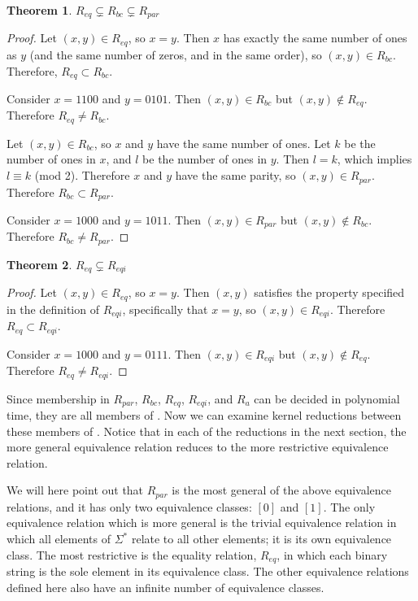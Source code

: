 \documentclass{amsart}
\newtheorem{theorem}{Theorem}[section]
\theoremstyle{definition} \newtheorem{definition}[definition]{Definition}
\newcommand{\sigmastar}{\Sigma^{*}} %
\begin{document}
\begin{theorem}$R_{eq} \subsetneq R_{bc} \subsetneq R_{par}$\end{theorem}
\begin{proof}
  Let $(x, y)\in R_{eq}$, so $x=y$. Then $x$ has exactly the same number of
  ones as $y$ (and the same number of zeros, and in the same order), so $(x, y)
  \in R_{bc}$. Therefore, $R_{eq} \subset R_{bc}$.
 
  Consider $x=1100$ and $y=0101$. Then $(x, y)\in R_{bc}$ but $(x, y) \notin
  R_{eq}$. Therefore $R_{eq} \neq R_{bc}$.

  Let $(x, y)\in R_{bc}$, so $x$ and $y$ have the same number of ones. Let $k$
  be the number of ones in $x$, and $l$ be the number of ones in $y$. Then
  $l=k$, which implies $l \equiv k$ (mod 2). Therefore $x$ and $y$ have
  the same parity, so $(x, y)\in R_{par}$. Therefore $R_{bc} \subset R_{par}$.

  Consider $x=1000$ and $y=1011$. Then $(x, y)\in R_{par}$ but $(x, y) \notin
  R_{bc}$. Therefore $R_{bc} \neq R_{par}$.
\end{proof}

\begin{theorem}$R_{eq} \subsetneq R_{eqi}$\end{theorem}
\begin{proof}
  Let $(x, y)\in R_{eq}$, so $x=y$. Then $(x, y)$ satisfies the property
  specified in the definition of $R_{eqi}$, specifically that $x=y$, so
  $(x, y) \in R_{eqi}$. Therefore $R_{eq} \subset R_{eqi}$.

  Consider $x=1000$ and $y=0111$. Then $(x, y)\in R_{eqi}$ but $(x, y) \notin
  R_{eq}$. Therefore $R_{eq} \neq R_{eqi}$.
\end{proof}

Since membership in $R_{par}$, $R_{bc}$, $R_{eq}$, $R_{eqi}$, and $R_a$ can be
decided in polynomial time, they are all members of \PEq. Now we can examine
kernel reductions between these members of \PEq. Notice that in each of the
reductions in the next section, the more general equivalence relation reduces
to the more restrictive equivalence relation.

We will here point out that $R_{par}$ is the most general of the above
equivalence relations, and it has only two equivalence classes: $[0]$ and
$[1]$. The only equivalence relation which is more general is the trivial
equivalence relation in which all elements of $\sigmastar$ relate to all other
elements; it is its own equivalence class. The most restrictive is the equality
relation, $R_{eq}$, in which each binary string is the sole element in its
equivalence class. The other equivalence relations defined here also have an
infinite number of equivalence classes.
\end{document}
